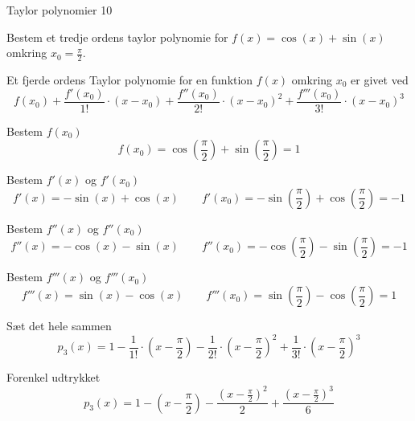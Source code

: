 \documentclass{article}
\begin{document}
\begin{exercise}{Taylor polynomier 10}
	
	Bestem et tredje ordens taylor polynomie for $f(x) = \cos(x) + \sin(x)$
	omkring $x_0 = \frac{\pi}{2}$.
	
	
	\hint
	Et fjerde ordens Taylor polynomie for en funktion $f(x)$
	omkring $x_0$ er givet ved
	\[
	f(x_0) + \frac{f'(x_0)}{1!} \cdot (x - x_0) 
	+ \frac{f''(x_0)}{2!} \cdot (x - x_0)^2 
	+ \frac{f'''(x_0)}{3!} \cdot (x - x_0)^3 
	\]
	
	
	\hint
	Bestem $f(x_0)$
	\[
	f(x_0)  = \cos\left( \frac{\pi}{2} \right) + \sin\left( \frac{\pi}{2} \right) = 1
	\]
	
	\hint
	Bestem $f'(x)$ og $f'(x_0)$
	\[
	f'(x) = -\sin(x) + \cos(x) \qquad f'(x_0)= -\sin\left( \frac{\pi}{2} \right) + \cos\left( \frac{\pi}{2} \right) = -1
	\]
	
	\hint
	Bestem $f''(x)$ og $f''(x_0)$
	\[
	f''(x) = -\cos(x) - \sin(x) \qquad f''(x_0)  = - \cos\left( \frac{\pi}{2} \right) - \sin\left( \frac{\pi}{2} \right) = -1
	\]
	
	\hint
	Bestem $f'''(x)$ og $f'''(x_0)$
	\[
	f'''(x) = \sin(x) - \cos(x) \qquad f'''(x_0) =  \sin\left( \frac{\pi}{2} \right) - \cos\left( \frac{\pi}{2} \right) = 1
	\]
	
	\hint
	Sæt det hele sammen
	\[
	p_3(x) = 1 - \frac{1}{1!}\cdot \left( x - \frac{\pi}{2} \right) - \frac{1}{2!} \cdot \left( x - \frac{\pi}{2} \right)^2 + \frac{1}{3!}\cdot \left( x - \frac{\pi}{2} \right)^3
	\]
	
	\hint
	Forenkel udtrykket
	\[
	p_3(x) = 1 - \left( x - \frac{\pi}{2} \right) - \frac{\left( x - \frac{\pi}{2} \right)^2}{2} + \frac{\left( x - \frac{\pi}{2} \right)^3}{6}
	\]
	
	
\end{exercise}
\end{document}
